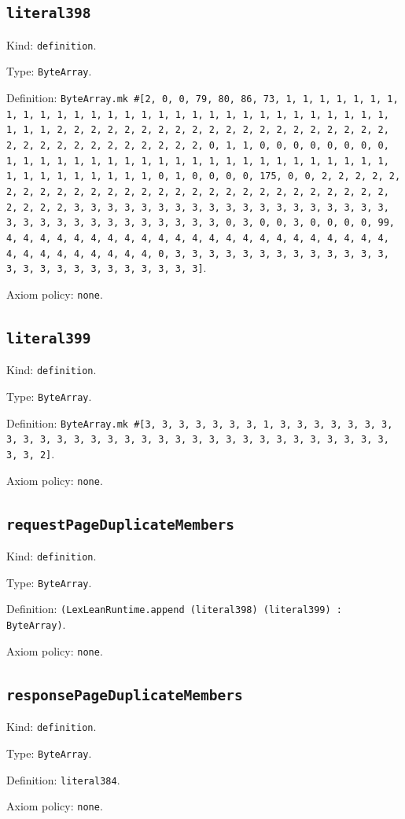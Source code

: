 \documentclass[11pt]{article}
\begin{document}
\subsection*{\texttt{literal398}}
\noindent Kind: \texttt{definition}.\par
\noindent Type: \texttt{ByteArray}.\par
\noindent Definition: \texttt{ByteArray.mk \#[2, 0, 0, 79, 80, 86, 73, 1, 1, 1, 1, 1, 1, 1, 1, 1, 1, 1, 1, 1, 1, 1, 1, 1, 1, 1, 1, 1, 1, 1, 1, 1, 1, 1, 1, 1, 1, 1, 1, 1, 2, 2, 2, 2, 2, 2, 2, 2, 2, 2, 2, 2, 2, 2, 2, 2, 2, 2, 2, 2, 2, 2, 2, 2, 2, 2, 2, 2, 2, 2, 2, 2, 0, 1, 1, 0, 0, 0, 0, 0, 0, 0, 0, 1, 1, 1, 1, 1, 1, 1, 1, 1, 1, 1, 1, 1, 1, 1, 1, 1, 1, 1, 1, 1, 1, 1, 1, 1, 1, 1, 1, 1, 1, 1, 1, 0, 1, 0, 0, 0, 0, 175, 0, 0, 2, 2, 2, 2, 2, 2, 2, 2, 2, 2, 2, 2, 2, 2, 2, 2, 2, 2, 2, 2, 2, 2, 2, 2, 2, 2, 2, 2, 2, 2, 2, 2, 3, 3, 3, 3, 3, 3, 3, 3, 3, 3, 3, 3, 3, 3, 3, 3, 3, 3, 3, 3, 3, 3, 3, 3, 3, 3, 3, 3, 3, 3, 3, 3, 0, 3, 0, 0, 3, 0, 0, 0, 0, 99, 4, 4, 4, 4, 4, 4, 4, 4, 4, 4, 4, 4, 4, 4, 4, 4, 4, 4, 4, 4, 4, 4, 4, 4, 4, 4, 4, 4, 4, 4, 4, 4, 0, 3, 3, 3, 3, 3, 3, 3, 3, 3, 3, 3, 3, 3, 3, 3, 3, 3, 3, 3, 3, 3, 3, 3, 3, 3]}.\par
\noindent Axiom policy: \texttt{none}.\par
\subsection*{\texttt{literal399}}
\noindent Kind: \texttt{definition}.\par
\noindent Type: \texttt{ByteArray}.\par
\noindent Definition: \texttt{ByteArray.mk \#[3, 3, 3, 3, 3, 3, 3, 1, 3, 3, 3, 3, 3, 3, 3, 3, 3, 3, 3, 3, 3, 3, 3, 3, 3, 3, 3, 3, 3, 3, 3, 3, 3, 3, 3, 3, 3, 3, 3, 3, 2]}.\par
\noindent Axiom policy: \texttt{none}.\par
\subsection*{\texttt{requestPageDuplicateMembers}}
\noindent Kind: \texttt{definition}.\par
\noindent Type: \texttt{ByteArray}.\par
\noindent Definition: \texttt{(LexLeanRuntime.append (literal398) (literal399) : ByteArray)}.\par
\noindent Axiom policy: \texttt{none}.\par
\subsection*{\texttt{responsePageDuplicateMembers}}
\noindent Kind: \texttt{definition}.\par
\noindent Type: \texttt{ByteArray}.\par
\noindent Definition: \texttt{literal384}.\par
\noindent Axiom policy: \texttt{none}.\par
\end{document}

